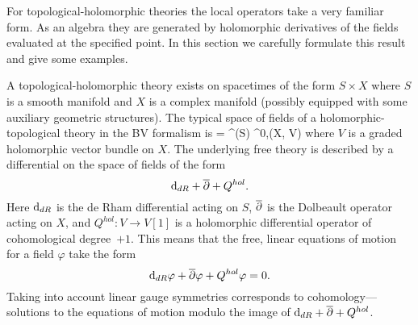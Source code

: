 For topological-holomorphic theories the local operators take a very familiar form.
As an algebra they are generated by holomorphic derivatives of the fields evaluated at the specified point. 
In this section we carefully formulate this result and give some examples.

\parsec[s:free]

%
%
A topological-holomorphic theory exists on spacetimes of the form $S \times X$ where $S$ is a smooth manifold and $X$ is a complex manifold (possibly equipped with some auxiliary geometric structures). 
The typical space of fields of a holomorphic-topological theory in the BV formalism is
\beqn\label{eqn:cE}
\cE = \Omega^\bu (S) \hotimes \Omega^{0,\bu}(X, V) 
\eeqn
where $V$ is a graded holomorphic vector bundle on $X$.
The underlying free theory is described by a differential on the space of fields of the form
\[
{\rm d}_{dR} + \overline{\partial} + Q^{hol} .
\]
Here ${\rm d}_{dR}$ is the de Rham differential acting on $S$, $\overline{\partial}$ is the Dolbeault operator acting on $X$, and $Q^{hol} \colon V \to V[1]$ is a holomorphic differential operator of cohomological degree~$+1$.
This means that the free, linear equations of motion for a field $\varphi$ take the form
\[
{\rm d}_{dR} \varphi + \overline{\partial} \varphi + Q^{hol} \varphi = 0 .
\]
Taking into account linear gauge symmetries corresponds to cohomology---solutions to the equations of motion modulo the image of ${\rm d}_{dR} + \overline{\partial} + Q^{hol}$.

